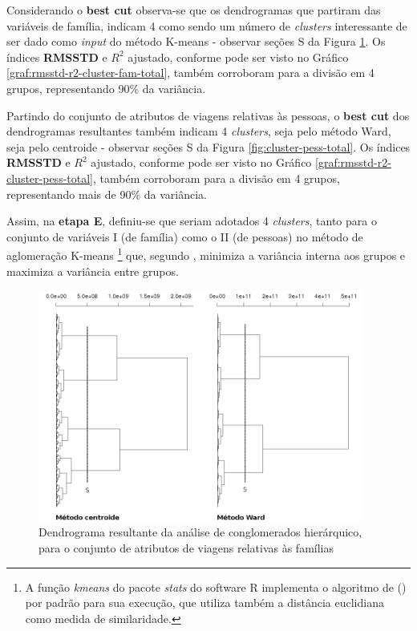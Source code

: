 Considerando o \textbf{best cut} observa-se que os dendrogramas que partiram das variáveis de família, indicam 4 como sendo um número de \textit{clusters} interessante de ser dado como \textit{input} do método K-means - observar seções S da Figura \ref{fig:cluster-fam-total}. Os índices \textbf{RMSSTD} e \textbf{$R^2$} ajustado, conforme pode ser visto no Gráfico \ref{graf:rmsstd-r2-cluster-fam-total}, também corroboram para a divisão em 4 grupos, representando 90\% da variância.

Partindo do conjunto de atributos de viagens relativas às pessoas, o \textbf{best cut} dos dendrogramas resultantes também indicam 4 \textit{clusters}, seja pelo método Ward, seja pelo centroide - observar seções S da Figura \ref{fig:cluster-pess-total}. Os índices \textbf{RMSSTD} e \textbf{$R^2$} ajustado, conforme pode ser visto no Gráfico \ref{graf:rmsstd-r2-cluster-pess-total}, também corroboram para a divisão em 4 grupos, representando mais de 90\% da variância.

Assim, na \textbf{etapa E}, definiu-se que seriam adotados 4 \textit{clusters}, tanto para o conjunto de variáveis I (de família) como o II (de pessoas) no método de aglomeração K-means
\footnote{ A função \textit{kmeans} do pacote \textit{stats} do software R implementa o algoritmo de  (\citeyear{HARTIGAN1979}) por padrão para sua execução, que utiliza também a distância euclidiana como medida de similaridade.} 
que, segundo , minimiza a variância interna aos grupos e maximiza a variância entre grupos.

\begin{figure}[htb]%
    \caption{\label{fig:cluster-fam-total}Dendrograma resultante da análise de conglomerados hierárquico, para o conjunto de atributos de viagens relativas às famílias}%
    \begin{center}%
        \includegraphics[width=0.95\textwidth]{./imagens/dendro-hierarq-cluster-familia-total-final.png}%
    \end{center}%
\end{figure}%


